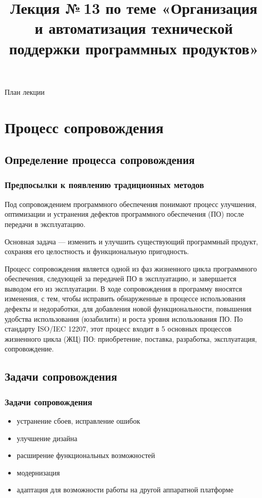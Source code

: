 \documentclass{industrial-development}
\title{Лекция №\,13 по теме «Организация и автоматизация технической поддержки программных продуктов»}
\author{ }
\date{}
\begin{document}
\begin{frame}
  \titlepage
\end{frame}

\begin{frame}{План лекции}
  \tableofcontents
\end{frame}  

\section{Процесс сопровождения}
\subsection{Определение процесса сопровождения}


\begin{frame} \frametitle{Предпосылки к появлению традиционных методов}

	\begin{definition}
		\alert{Под сопровождением программного обеспечения} 
		 понимают процесс улучшения, оптимизации и устранения дефектов программного обеспечения (ПО) после передачи в эксплуатацию.
	\end{definition}
	
	Основная задача — изменить и улучшить существующий программный продукт, сохраняя его целостность и функциональную пригодность. 
	
\end{frame}

\lecturenotes
Процесс сопровождения является одной из фаз жизненного цикла программного обеспечения, следующей за передачей ПО в эксплуатацию, и завершается выводом его из эксплуатации. В ходе сопровождения в программу вносятся изменения, с тем, чтобы исправить обнаруженные в процессе использования дефекты и недоработки, для добавления новой функциональности, повышения удобства использования (юзабилити) и роста уровня использования ПО. По стандарту ISO/IEC 12207, этот процесс входит в 5 основных процессов жизненного цикла (ЖЦ) ПО: приобретение, поставка, разработка, эксплуатация, сопровождение. 


\subsection{Задачи сопровождения}
\begin{frame} \frametitle{Задачи сопровождения}
	\begin{itemize}
		\item устранение сбоев, исправление ошибок
		\item улучшение дизайна 
		\item расширение функциональных возможностей 
		\item модернизация
		\item адаптация для возможности работы на другой аппаратной платформе
	\end{itemize}
\end{frame}
\end{document}
